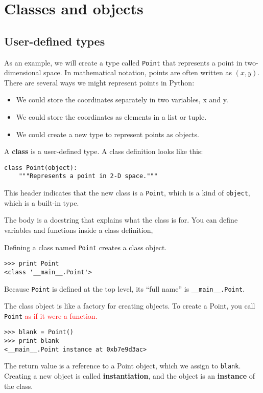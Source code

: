 \documentclass{article}
\begin{document}
\section{Classes and objects}
\begin{multicols}{2}
\subsection{User-defined types}
As an example, we will create a type called \verb|Point| that
represents a point in two-dimensional space.
In mathematical notation, points are often written as $(x,y)$.
There are several ways we might represent points in Python:
\begin{itemize}
    \item We could store the coordinates separately in two variables, x and y.
    \item We could store the coordinates as elements in a list or tuple.
    \item We could create a new type to represent points as objects.
\end{itemize}
A \textbf{class} is a user-defined type. A class definition looks like this:
\begin{lstlisting}
class Point(object):
    """Represents a point in 2-D space."""
\end{lstlisting}

This header indicates that the new class is a \verb|Point|, which is a
kind of \verb|object|, which is a built-in type.

The body is a docstring that explains what the class is for.
You can define variables and functions inside a class definition,

Defining a class named \verb|Point| creates a class object.
\begin{lstlisting}
>>> print Point
<class '__main__.Point'>
\end{lstlisting}
Because \verb|Point| is defined at the top level, its ``full name'' is
\verb|__main__.Point|.

The class object is like a factory for creating objects.
To create a Point, you call \verb|Point|
\textcolor{red}{as if it were a function.}
\begin{lstlisting}
>>> blank = Point()
>>> print blank
<__main__.Point instance at 0xb7e9d3ac>
\end{lstlisting}
The return value is a reference to a Point object, which we assign to
\verb|blank|. Creating a new object is called \textbf{instantiation},
and the object is an
\textbf{instance} of the class.


\end{multicols}
\end{document}

